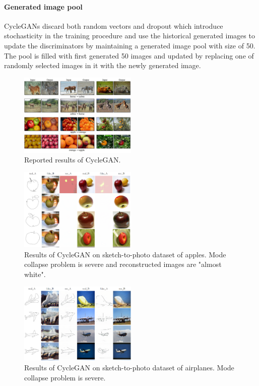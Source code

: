 \paragraph{Generated image pool}
CycleGANs discard both random vectors and dropout which introduce stochasticity in the training procedure and use the historical generated images to update the discriminators by maintaining a generated image pool with size of 50. The pool is filled with first generated 50 images and updated by replacing one of randomly selected images in it with the newly generated image.
%
\begin{figure}
	
	\includegraphics[width=0.5\textwidth]{figures/cyclegan/reported_results.jpg}
	\caption{\label{cyclegan_reported_results}Reported results of CycleGAN.}
\end{figure}
%
\begin{figure}
	
	\includegraphics[width=0.5\textwidth]{figures/cyclegan/sketch2photo_apple_200epochs_torch.png}
	\caption{\label{cyclegan_sketch2photo_apple}Results of CycleGAN on sketch-to-photo dataset of apples. Mode collapse problem is severe and reconstructed images are "almost white".}
\end{figure}
%
\begin{figure}
	\includegraphics[width=0.5\textwidth]{figures/cyclegan/sketch2photo_airplane_200epochs_torch.png}
	\caption{\label{cyclegan_sketch2photo_airplane}Results of CycleGAN on sketch-to-photo dataset of airplanes. Mode collapse problem is severe.}
\end{figure}
%
%
